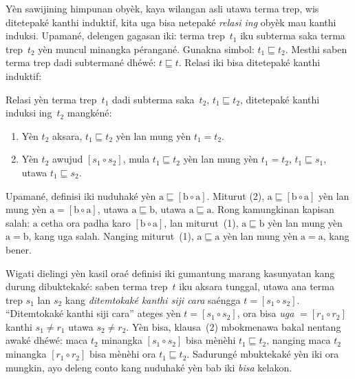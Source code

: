 \documentclass[../../../include/open-logic-section]{subfiles}
\begin{document}


Yèn sawijining himpunan obyèk, kaya wilangan asli
utawa terma trep, wis ditetepaké kanthi induktif,
kita uga bisa netepaké \emph{relasi ing}
obyèk mau kanthi induksi. Upamané, delengen
gagasan iki: terma trep~$t_1$ iku subterma
saka terma trep~$t_2$ yèn muncul minangka
pérangané. Gunakna simbol:
$t_1 \sqsubseteq t_2$. Mesthi saben terma
trep dadi subtermané dhéwé:
$t \sqsubseteq t$. Relasi iki bisa
ditetepaké kanthi induktif:

\begin{defn}
  Relasi yèn terma trep~$t_1$
  dadi subterma saka~$t_2$,
  $t_1
  \sqsubseteq t_2$,
  ditetepaké kanthi induksi
  ing~$t_2$ mangkéné:
  \begin{enumerate}
  \item Yèn $t_2$ aksara,
    $t_1 \sqsubseteq t_2$ yèn
    lan mung yèn $t_1 = t_2$.
  \item Yèn $t_2$ awujud
    $[s_1 \circ s_2]$, mula
    $t_1 \sqsubseteq t_2$ yèn
    lan mung yèn $t_1 =
    t_2$, $t_1 \sqsubseteq s_1$,
    utawa $t_1 \sqsubseteq s_2$.
  \end{enumerate}
\end{defn}

Upamané, definisi iki nuduhaké
yèn $\mathrm{a}
\sqsubseteq [\mathrm{b} \circ \mathrm{a}]$.
Miturut (2),
$\mathrm{a} \sqsubseteq [\mathrm{b} \circ \mathrm{a}]$
yèn lan mung yèn
$\mathrm{a}
= [\mathrm{b} \circ \mathrm{a}]$,
utawa $\mathrm{a} \sqsubseteq \mathrm{b}$,
utawa $\mathrm{a} \sqsubseteq \mathrm{a}$.
Rong kamungkinan kapisan salah:
$\mathrm{a}$ cetha ora padha karo
$[\mathrm{b} \circ
  \mathrm{a}]$, lan miturut~(1),
$\mathrm{a} \sqsubseteq \mathrm{b}$
yèn lan mung yèn
$\mathrm{a} = \mathrm{b}$,
kang uga salah. Nanging miturut~(1),
$\mathrm{a} \sqsubseteq \mathrm{a}$
yèn lan mung yèn
$\mathrm{a} = \mathrm{a}$,
kang bener.

Wigati dielingi yèn kasil oraé
definisi iki gumantung marang
kasunyatan kang durung dibuktekaké:
saben terma trep~$t$ iku aksara
tunggal, utawa ana terma trep
$s_1$ lan $s_2$ kang
\emph{ditemtokaké kanthi siji cara}
saéngga $t = [s_1 \circ s_2]$.
``Ditemtokaké kanthi siji cara''
ateges yèn $t = [s_1 \circ s_2]$,
ora bisa \emph{uga}
$= [r_1 \circ r_2]$
kanthi $s_1 \neq r_1$
utawa $s_2 \neq r_2$.
Yèn bisa, klausa~(2)
mbokmenawa bakal nentang
awaké dhéwé: maca $t_2$
minangka $[s_1 \circ s_2]$
bisa mènèhi $t_1
\sqsubseteq t_2$, nanging
maca $t_2$ minangka
$[r_1 \circ r_2]$ bisa
mènèhi ora $t_1 \sqsubseteq t_2$.
Sadurungé mbuktekaké yèn iki
ora mungkin, ayo deleng conto
kang nuduhaké yèn bab iki
\emph{bisa} kelakon.
\end{document}
